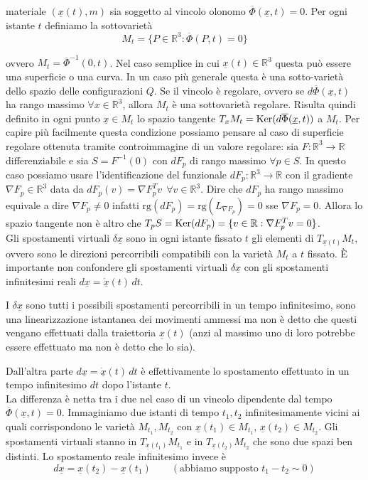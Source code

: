 materiale \((\underline{x}(t),m)\) sia soggetto al vincolo olonomo \(\overline{\Phi}(\underline{x},t)=0\).
Per ogni istante \(t\) definiamo la sottovarietà
\[
M_t=\{P\in\mathbb{R}^3:\overline{\Phi}(P,t)=0\}
\]

ovvero \(M_t=\overline{\Phi}^{-1}(0,t)\). Nel caso semplice in cui \(\underline{x}(t)\in\mathbb{R}^3\) questa può essere una superficie o una curva. In un caso più generale questa è una sotto-varietà dello spazio delle configurazioni \(Q\).
Se il vincolo è regolare, ovvero se \(d\overline{\Phi}(\underline{x},t)\) ha rango massimo \(\forall x\in\mathbb{R}^3\), allora \(M_t\) è una sottovarietà regolare. Risulta quindi definito in ogni punto \(\underline{x}\in M_t\) lo spazio tangente \(T_xM_t=\operatorname{Ker}(d\overline{\Phi}(\underline{x},t))\) a \(M_t\).
Per capire più facilmente questa condizione possiamo pensare al caso di superficie regolare ottenuta tramite controimmagine di un valore regolare: sia \(F:\mathbb{R}^3\to\mathbb{R}\) differenziabile e sia \(S=F^{-1}(0)\) con \(dF_p\) di rango massimo \(\forall p\in S\). In questo caso possiamo usare l'identificazione del funzionale \(dF_p:\mathbb{R}^3\to\mathbb{R}\) con il gradiente \(\nabla F_p\in\mathbb{R}^3\) data da \(dF_p(v)=\nabla F_p^Tv\ \ \forall v\in\mathbb{R}^3\).
Dire che \(dF_p\) ha rango massimo equivale a dire \(\nabla F_p\neq 0\) infatti \(\mathrm{rg}(dF_p)=\mathrm{rg}(L_{\nabla F_p})=0\) sse \(\nabla F_p=0\).
Allora lo spazio tangente non è altro che \(T_pS=\operatorname{Ker}(dF_p)=\{v\in\mathbb{R}: \nabla F_p^Tv=0\}\).\\
Gli spostamenti virtuali \(\delta \underline{x}\) sono in ogni istante fissato \(t\) gli elementi di \(T_{\underline{x}(t)}M_t\), ovvero sono le direzioni percorribili compatibili con la varietà \(M_t\) a \(t\) fissato.
È importante non confondere gli spostamenti virtuali \(\delta \underline{x}\) con gli spostamenti infinitesimi reali \(d\underline{x}=\underline{\dot{x}}(t)\,dt\).

I \(\delta \underline{x}\) sono tutti i possibili spostamenti percorribili in un tempo infinitesimo, sono una linearizzazione istantanea dei movimenti ammessi ma non è detto che questi vengano effettuati dalla traiettoria \(\underline{x}(t)\) (anzi al massimo uno di loro potrebbe essere effettuato ma non è detto che lo sia).

Dall'altra parte \(d\underline{x}=\underline{\dot{x}}(t)\,dt\) è effettivamente lo spostamento effettuato in un tempo infinitesimo \(dt\) dopo l'istante \(t\).\\
La differenza è netta tra i due nel caso di un vincolo dipendente dal tempo \(\overline{\Phi}(\underline{x},t)=0\). Immaginiamo due istanti di tempo \(t_1,t_2\) infinitesimamente vicini ai quali corrispondono le varietà \(M_{t_1},M_{t_2}\) con \(\underline{x}(t_1)\in M_{t_1}\), \(\underline{x}(t_2)\in M_{t_2}\).
Gli spostamenti virtuali stanno in \(T_{\underline{x}(t_1)}M_{t_1}\) e in \(T_{\underline{x}(t_2)}M_{t_2}\) che sono due spazi ben distinti. Lo spostamento reale infinitesimo invece è
\[
d\underline{x}=\underline{x}(t_2)-\underline{x}(t_1)\qquad (\text{abbiamo supposto } t_1-t_2\sim 0)
\]

